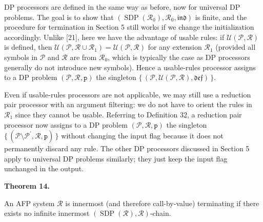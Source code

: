 \documentclass[10pt,a4paper]{amsart}
\begin{document}
 
 
 
DP processors are defined in the same way as before, now for universal DP problems. The goal is to show that $(\operatorname{SDP}(\mathcal{R}_{0}),\mathcal{R}_{0},\mathfrak{ind})$ is finite, and the procedure for termination in Section 5 still works if we change the initialization accordingly. Unlike [21], here we have the advantage of usable rules: if $\mathcal{U}(\mathcal{P},\mathcal{R})$ is defined, then $\mathcal{U}(\mathcal{P},\mathcal{R}\cup\mathcal{R}_{1})=\mathcal{U}(\mathcal{P},\mathcal{R})$ for any extension $\mathcal{R}_{1}$ (provided all symbols in $\mathcal{P}$ and $\mathcal{R}$ are from $\mathcal{R}_{0}$, which is typically the case as DP processors generally do not introduce new symbols). Hence a usable-rules processor assigns to a DP problem $(\mathcal{P},\mathcal{R},\mathtt{p})$ the singleton $\{\,(\mathcal{P},\mathcal{U}(\mathcal{P},\mathcal{R}),\mathfrak{def})\,\}$.\par
 
 
 
Even if usable-rules processors are not applicable, we may still use a reduction pair processor with an argument filtering: we do not have to orient the rules in $\mathcal{R}_{1}$ since they cannot be usable. Referring to Definition 32, a reduction pair processor now assigns to a DP problem $(\mathcal{P},\mathcal{R},\mathtt{p})$ the singleton $\{\,(\mathcal{P}\setminus\mathcal{P}^{\prime},\mathcal{R},\mathtt{p})\,\}$ without changing the input flag because it does not permanently discard any rule. The other DP processors discussed in Section 5 apply to universal DP problems similarly; they just keep the input flag unchanged in the output.\par
 
 

 
\par\medskip\noindent\textbf{Theorem 14.}\par
 
 
An AFP system $\mathcal{R}$ is innermost (and therefore call-by-value) terminating if there exists no infinite innermost $(\operatorname{SDP}(\mathcal{R}),\mathcal{R})$-chain.\par
 
\end{document}
